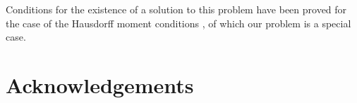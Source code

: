 \documentclass[letterpaper]{article} %
\begin{document}
Conditions for the existence of a solution to this problem have been proved for the case of the Hausdorff moment conditions \cite{mead1984maximum}, of which our problem is a special case.

\section*{Acknowledgements}







\end{document}
